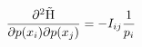 $$ \frac {\partial ^2 \tilde{{\rm {\rm H}}}}{\partial p(x_i)\partial p(x_j)} = -I_{ij}\frac{1}{p_i} $$
